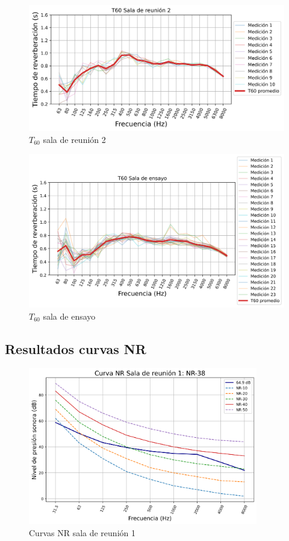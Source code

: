 \begin{figure}[H]
    \centering
    \includegraphics[width=12cm]{Imagenes/Resultados/T60_Sala_reunion_2.png}
    \caption{$T_{60}$ sala de reunión 2}
    \label{fig: T60 sala2}
\end{figure}

\begin{figure}[H]
    \centering
    \includegraphics[width=12cm]{Imagenes/Resultados/T60_Sala_de_ensayo.png}
    \caption{$T_{60}$ sala de ensayo}
    \label{fig: T60 sala de ensayo}
\end{figure}

\subsection{Resultados curvas NR}
    \begin{figure}[H]
        \centering
        \includegraphics[width=10cm]{Imagenes/Resultados/Curvas NC-NR/NR reunion 1.png}
        \caption{Curvas NR sala de reunión 1}
        \label{fig: Curvas NR sala 1}
    \end{figure}

